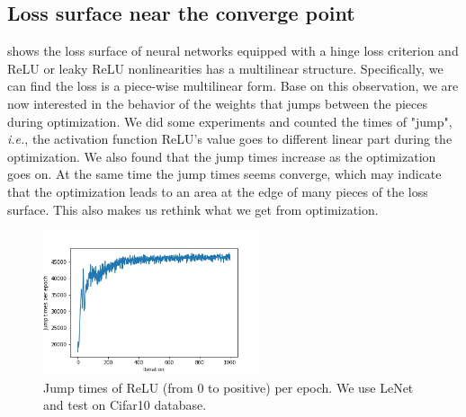 \documentclass{article}
\theoremstyle{plain}
\theoremstyle{definition}
\begin{document}
\subsection{Loss surface near the converge point}
\cite{DBLP:journals/corr/abs-1712-10132} shows the loss surface of neural networks equipped with a hinge loss criterion and ReLU or leaky ReLU nonlinearities has a multilinear structure. Specifically, we can find the loss is a piece-wise multilinear form. Base on this observation, we are now interested in the behavior of the weights that jumps between the pieces during optimization. 
We did some experiments and counted the times of "jump", \emph{i.e.}, the activation function ReLU's value goes to different linear part during the optimization. We also found that the jump times increase as the optimization goes on. At the same time the jump times seems converge, which may indicate that the optimization leads to an area at the edge of many pieces of the loss surface. This also makes us rethink what we get from optimization.

\begin{figure}[H]
	\centering
	\includegraphics[width=2.5in]{PieceJump.jpg}
	\caption{Jump times of ReLU (from 0 to positive) per epoch. We use LeNet and test on Cifar10 database.}
	\label{piecejump}
\end{figure}



\end{document}
